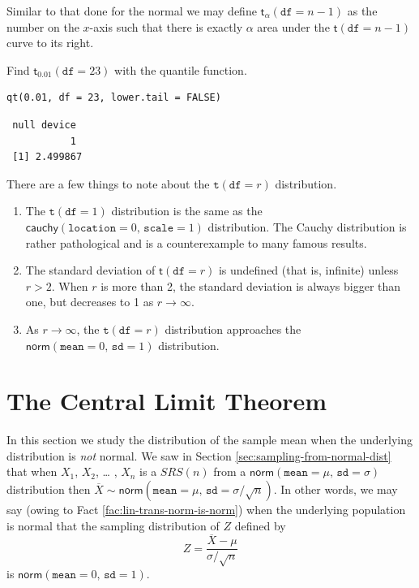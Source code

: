 \documentclass[captions=tableheading]{scrbook}
\begin{document}
Similar to that done for the normal we may define \(\mathsf{t}_{\alpha}(\mathtt{df}=n-1)\) as the number on the \(x\)-axis such that there is exactly \(\alpha\) area under the \(\mathsf{t}(\mathtt{df}=n-1)\) curve to its right.

\begin{example}
Find \(\mathsf{t}{}_{0.01}(\mathtt{df}=23)\) with the quantile function.
\end{example}


\begin{verbatim}
qt(0.01, df = 23, lower.tail = FALSE)
\end{verbatim}

\begin{verbatim}
 null device 
           1
 [1] 2.499867
\end{verbatim}

\begin{rem}
There are a few things to note about the \(\mathtt{t}(\mathtt{df}=r)\) distribution.
\begin{enumerate}
\item The \(\mathtt{t}(\mathtt{df}=1)\) distribution is the same as the \(\mathsf{cauchy}(\mathtt{location}=0,\,\mathtt{scale}=1)\) distribution. The Cauchy distribution is rather pathological and is a counterexample to many famous results.
\item The standard deviation of \(\mathsf{t}(\mathtt{df}=r)\) is undefined (that is, infinite) unless \(r>2\). When \(r\) is more than 2, the standard deviation is always bigger than one, but decreases to 1 as \(r\to\infty\).
\item As \(r\to\infty\), the \(\mathtt{t}(\mathtt{df}=r)\) distribution approaches the \(\mathsf{norm}(\mathtt{mean}=0,\,\mathtt{sd}=1)\) distribution.
\end{enumerate}
\end{rem}
\section{The Central Limit Theorem}
\label{sec-8-3}

\label{sec:Central-Limit-Theorem}

In this section we study the distribution of the sample mean when the underlying distribution is \emph{not} normal. We saw in Section \ref{sec:sampling-from-normal-dist} that when \(X_{1}\), \(X_{2}\), \ldots{} , \(X_{n}\) is a \(SRS(n)\) from a \(\mathsf{norm}(\mathtt{mean}=\mu,\,\mathtt{sd}=\sigma)\) distribution then \(\overline{X}\sim\mathsf{norm}(\mathtt{mean}=\mu,\,\mathtt{sd}=\sigma/\sqrt{n})\). In other words, we may say (owing to Fact \ref{fac:lin-trans-norm-is-norm}) when the underlying population is normal that the sampling distribution of \(Z\) defined by
\begin{equation}
Z=\frac{\overline{X}-\mu}{\sigma/\sqrt{n}}
\end{equation}
is \(\mathsf{norm}(\mathtt{mean}=0,\,\mathtt{sd}=1)\). 
\end{document}
